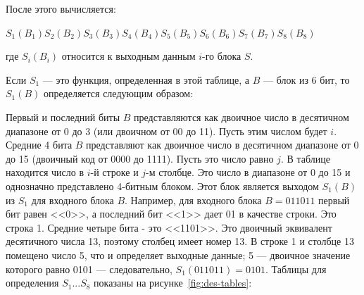 После этого вычисляется:

$S_1(B_1)S_2(B_2)S_3(B_3)S_4(B_4)S_5(B_5)S_6(B_6)S_7(B_7)S_8(B_8)$

где $S_i(B_i)$ относится к выходным данным $i$-го блока $S$.

Если $S_1$ --- это функция, определенная в этой таблице, а $B$ --- блок из 6 бит, то $S_1(B)$ определяется следующим образом: 

Первый и последний биты $B$ представляются как двоичное число в десятичном диапазоне от 0 до 3 (или двоичном от 00 до 11). 
Пусть этим числом будет $i$. 
Средние 4 бита $B$ представляют как двоичное число в десятичном диапазоне от 0 до 15 (двоичный код от 0000 до 1111). 
Пусть это число равно $j$. 
В таблице находится число в $i$-й строке и $j$-м столбце. 
Это число в диапазоне от 0 до 15 и однозначно представлено 4-битным блоком. 
Этот блок является выходом $S_1(B)$ из $S_1$ для входного блока $B$. 
Например, для входного блока $B = 011011$ первый бит равен <<0>>, а последний бит <<1>> дает 01 в качестве строки. 
Это строка 1. 
Средние четыре бита - это <<1101>>. 
Это двоичный эквивалент десятичного числа 13, поэтому столбец имеет номер 13. 
В строке 1 и столбце 13 помещено число 5, что и определяет выходные данные; 5 --- двоичное значение которого равно 0101 --- следовательно, $S_1(011011) = 0101$.
Таблицы для определения $S_1 ... S_8$ показаны на рисунке~\ref{fig:des-tables}:

